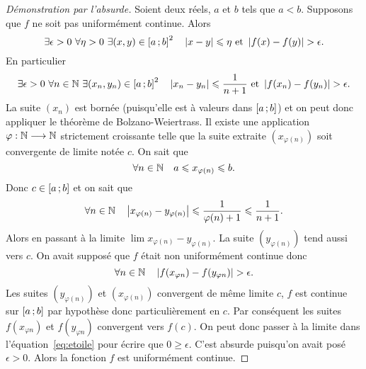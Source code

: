 \begin{proof}[Démonstration par l'absurde]
  Soient deux réels, \(a\) et \(b\) tels que \(a<b\). Supposons que \(f\) ne 
  soit pas uniformément continue. Alors
  \begin{equation}
    \exists \epsilon > 0 \ \forall \eta > 0 \ \exists (x,y) \in 
    \intervalleff{a}{b}^2 \quad \abs{x-y} \leqslant \eta \text{~et~} 
    \abs{f(x)-f(y)} > \epsilon.
  \end{equation}
  En particulier
  \begin{equation}
    \exists \epsilon > 0 \ \forall n \in \N \ \exists (x_n,y_n) \in 
    \intervalleff{a}{b}^2 \quad \abs{x_n-y_n} \leqslant \frac{1}{n+1} 
    \text{~et~} \abs{f(x_n)-f(y_n)} > \epsilon.
  \end{equation}
  La suite \((x_n)\) est bornée (puisqu'elle est à valeurs dans 
  \(\left[ a \, ; {} b \right]\)) et on peut donc appliquer le théorème de 
  Bolzano-Weiertrass. Il existe une application \(\varphi : \mathbb{N} \longrightarrow 
  \mathbb{N}\) strictement croissante telle que la suite extraite \((x_{\varphi(n)})\) 
  soit convergente de limite notée \(c\). On sait que
  \begin{equation}
    \forall n \in \mathbb{N} \quad a \leqslant x_{\varphi(n)} \leqslant b.
  \end{equation}
  Donc \(c \in \left[ a \, ; {} b \right]\) et on sait que
  \begin{equation}
    \forall n \in \mathbb{N} \quad \left\lvert x_{\varphi(n)}-y_{\varphi(n)}\right\rvert \leqslant 
    \frac{1}{\varphi(n)+1} \leqslant \frac{1}{n+1}.
  \end{equation}
  Alors en passant à la limite \(\lim x_{\varphi(n)}-y_{\varphi(n)}\). La suite 
  \((y_{\varphi(n)})\) tend aussi vers \(c\). On avait supposé que \(f\) était 
  non uniformément continue donc
  \begin{equation}\label{eq:etoile}
    \forall n \in \mathbb{N} \quad \left\lvert f(x_{\varphi{n}})-f(y_{\varphi{n}})\right\rvert > \epsilon.
  \end{equation}
  Les suites \((y_{\varphi(n)})\) et \((x_{\varphi(n)})\) convergent de même 
  limite \(c\), \(f\) est continue sur \(\left[ a \, ; {} b \right]\) par hypothèse 
  donc particulièrement en \(c\). Par conséquent les suites 
  \(f(x_{\varphi{n}})\) et \(f(y_{\varphi{n}})\) convergent vers \(f(c)\). On 
  peut donc passer à la limite dans l'équation~\ref{eq:etoile} pour écrire que
  \(0 \geqslant \epsilon\).
  C'est absurde puisqu'on avait posé \(\epsilon >0\). Alors la fonction \(f\)
  est uniformément continue.
\end{proof}
